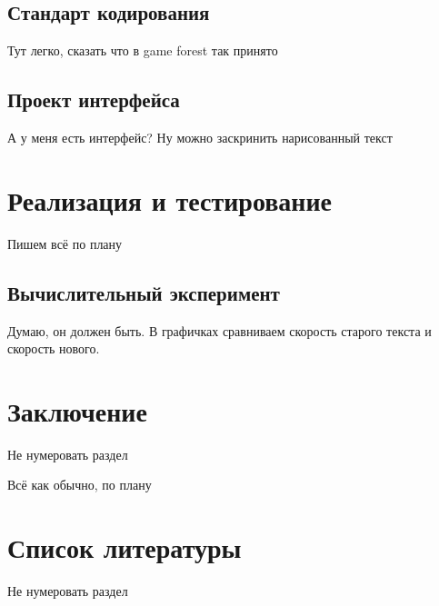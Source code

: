 \documentclass{fefu}
\begin{document}
	\subsection{Стандарт кодирования}
	\par Тут легко, сказать что в game forest так принято
	\subsection{Проект интерфейса}
	\par А у меня есть интерфейс? Ну можно заскринить нарисованный текст
	
	\section{Реализация и тестирование}
	\par Пишем всё по плану
	\subsection{Вычислительный эксперимент}
	\par Думаю, он должен быть. В графичках сравниваем скорость старого текста и скорость нового.
	
	\section{Заключение}
	\par Не нумеровать раздел
	\par Всё как обычно, по плану
	
	\section{Список литературы}
	\par Не нумеровать раздел
	
\end{document}
